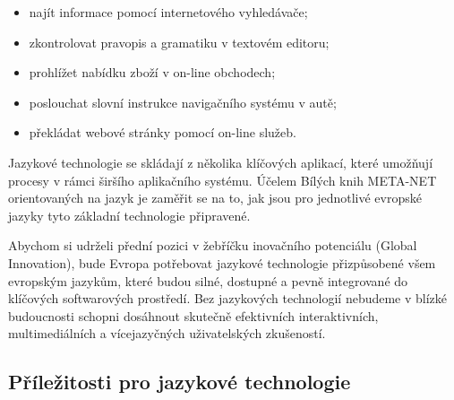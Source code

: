 \begin{multicols}{2}
\begin{itemize}
\item najít informace pomocí internetového vyhledávače;
\item zkontrolovat pravopis a gramatiku v textovém editoru;
\item prohlížet nabídku zboží v on-line obchodech;
\item poslouchat slovní instrukce navigačního systému v autě;
\item překládat webové stránky pomocí on-line služeb.
\end{itemize}

Jazykové technologie se skládají z několika klíčových aplikací, které umožňují procesy v rámci širšího aplikačního systému. Účelem Bílých knih META-NET orientovaných na jazyk je zaměřit se na to, jak jsou pro jednotlivé evropské jazyky tyto základní technologie připravené.


Abychom si udrželi přední pozici v žebříčku inovačního potenciálu (Global Innovation), bude Evropa potřebovat jazykové technologie přizpůsobené všem evropským jazykům, které budou silné, dostupné a pevně integrované do klíčových softwarových prostředí. Bez jazykových technologií nebudeme v blízké budoucnosti schopni dosáhnout skutečně efektivních interaktivních, multimediálních a vícejazyčných uživatelských zkušeností.

\subsection{Příležitosti pro jazykové technologie}


\end{multicols}
